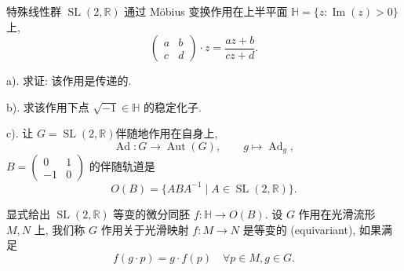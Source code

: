 \documentclass[../main.tex]{subfiles}
\begin{document}
\begin{exercise}{}{}
特殊线性群 \(\operatorname{SL}(2,\mathbb{R})\) 通过 Möbius 变换作用在上半平面 \(\mathbb{H}=\{z:\operatorname{Im}(z)>0\}\) 上,
\[
\begin{pmatrix}
a & b\\
c & d
\end{pmatrix}\cdot z=\frac{az+b}{cz+d}.
\]

a). 求证: 该作用是传递的.

b). 求该作用下点 \(\sqrt{-1}\in \mathbb{H}\) 的稳定化子.


c). 让 \(G=   \operatorname{SL}\left( 2,\mathbb{R}  \right)   \)伴随地作用在自身上,  
\[
\operatorname{Ad}:G\to \operatorname{Aut}(G),\qquad g\mapsto \operatorname{Ad}_g,
\]
 \(B=\begin{pmatrix}0 & 1\\ -1 & 0\end{pmatrix}\) 的伴随轨道是
\[
O(B)=\{ABA^{-1}\mid A\in \operatorname{SL}(2,\mathbb{R})\}.
\]

 显式给出 \(\operatorname{SL}(2,\mathbb{R})\) 等变的微分同胚
\(f:\mathbb{H}\to O(B)\). 设 \(G\) 作用在光滑流形 \(M,N\) 上, 我们称 \(G\) 作用关于光滑映射 \(f:M\to N\) 是等变的 (equivariant), 如果满足
\[
f(g\cdot p)=g\cdot f(p)\quad \forall p\in M,g\in G.
\]
\end{exercise}
\end{document}
